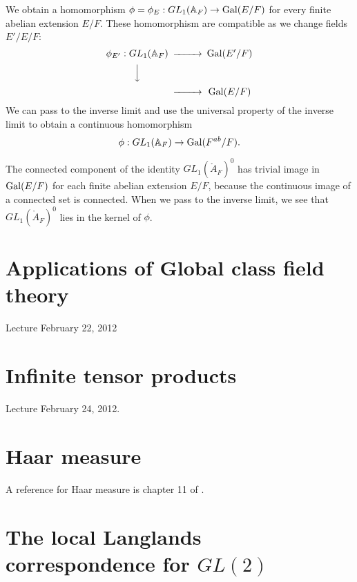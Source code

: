\documentclass{amsart}
\def\AA{\ring{A}}
\def\oG{\op{Gal}}
\begin{document}
We obtain a homomorphism $\phi = \phi_E:GL_1(\AA_F)\to \oG(E/F)$ for every finite
abelian extension $E/F$.  These homomorphism are compatible as we change fields $E'/E/F$:
\[
\begin{CD}
\phi_{E'}: GL_1(\AA_F) @>>> \oG(E'/F)\\
@VVV \\
@>>> \oG(E/F)\\
\end{CD}
\]
We can pass to the inverse limit and use the universal property of the inverse limit to
obtain a continuous homomorphism
\[
\phi: GL_1(\AA_F) \to \oG(F^{ab}/F).
\]

The connected component of the identity $GL_1(\AA_F)^0$ has trivial image in
$\oG(E/F)$ for each finite abelian extension $E/F$, because the continuous image
of a connected set is connected.  When we pass to the inverse limit, we see that
$GL_1(\AA_F)^0$ lies in the kernel of $\phi$.

\section{Applications of Global class field theory}

Lecture February 22, 2012

\section{Infinite tensor products}

Lecture February 24, 2012.

\section{Haar measure}

A reference for Haar measure is chapter 11 of \cite{Halmos-measure}.


\section{The local Langlands correspondence for $GL(2)$}



\raggedright




\end{document}
